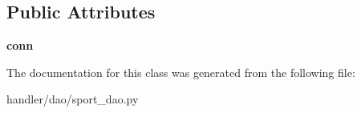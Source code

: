 \subsection*{Public Attributes}
\begin{DoxyCompactItemize}
\item 
\mbox{\label{classhandler_1_1dao_1_1sport__dao_1_1_sport_d_a_o_a7ca5b0f8d03cabbb9f2eec9abb9a70df}} 
{\bfseries conn}
\end{DoxyCompactItemize}


The documentation for this class was generated from the following file\+:\begin{DoxyCompactItemize}
\item 
handler/dao/sport\+\_\+dao.\+py\end{DoxyCompactItemize}
